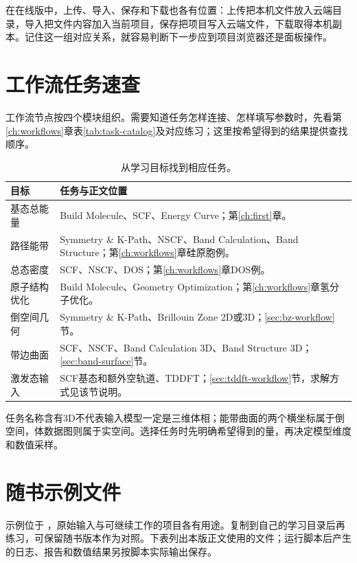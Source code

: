 在在线版中，上传、导入、保存和下载也各有位置：上传把本机文件放入云端目录，导入把文件内容加入当前项目，保存把项目写入云端文件，下载取得本机副本。记住这一组对应关系，就容易判断下一步应到项目浏览器还是面板操作。

\section{工作流任务速查}

工作流节点按四个模块组织。需要知道任务怎样连接、怎样填写参数时，先看第\ref{ch:workflows}章表\ref{tab:task-catalog}及对应练习；这里按希望得到的结果提供查找顺序。

\begin{table}[htbp]
\centering
\caption{从学习目标找到相应任务。}
\begin{tabularx}{\linewidth}{lX}
\toprule
目标 & 任务与正文位置 \\
\midrule
基态总能量 & Build Molecule、SCF、Energy Curve；第\ref{ch:first}章。 \\
路径能带 & Symmetry \& K-Path、NSCF、Band Calculation、Band Structure；第\ref{ch:workflows}章硅原胞例。 \\
总态密度 & SCF、NSCF、DOS；第\ref{ch:workflows}章DOS例。 \\
原子结构优化 & Build Molecule、Geometry Optimization；第\ref{ch:workflows}章氢分子优化。 \\
倒空间几何 & Symmetry \& K-Path、Brillouin Zone 2D或3D；\ref{sec:bz-workflow}节。 \\
带边曲面 & SCF、NSCF、Band Calculation 3D、Band Structure 3D；\ref{sec:band-surface}节。 \\
激发态输入 & SCF基态和额外空轨道、TDDFT；\ref{sec:tddft-workflow}节，求解方式见该节说明。 \\
\bottomrule
\end{tabularx}
\end{table}

任务名称含有3D不代表输入模型一定是三维体相；能带曲面的两个横坐标属于倒空间，体数据图则属于实空间。选择任务时先明确希望得到的量，再决定模型维度和数值采样。


\FloatBarrier
\section{随书示例文件}

示例位于 ，原始输入与可继续工作的项目各有用途。复制到自己的学习目录后再练习，可保留随书版本作为对照。下表列出本版正文使用的文件；运行脚本后产生的日志、报告和数值结果另按脚本实际输出保存。

